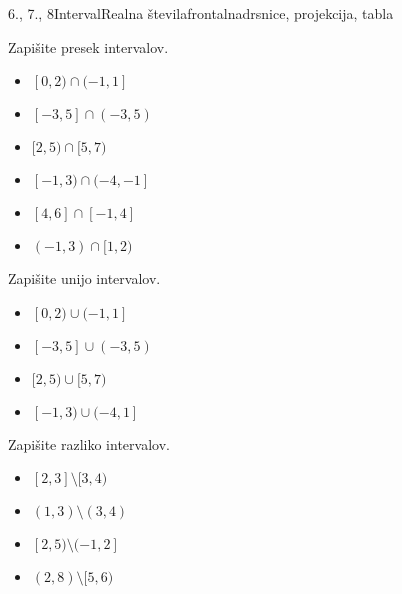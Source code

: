 \begin{priprava}{6., 7., 8}{}{Interval}{Realna števila}{frontalna}{drsnice, projekcija, tabla}
\begin{multicols}{2}
        
            \begin{naloga}
                Zapišite presek intervalov.
                \begin{itemize}
                    
                        \item $ [0,2)\cap(-1,1]$ 
                        \item $ [-3,5]\cap(-3,5)$ 
                        \item $ [2,5)\cap[5,7)$ 
                        \item $ [-1,3)\cap(-4,-1]$ 
                        \item $ [4,6]\cap[-1,4]$ 
                        \item $ (-1,3)\cap[1,2)$ 
                    

                \end{itemize}
            \end{naloga}
        


        
            \begin{naloga}
                Zapišite unijo intervalov.
                \begin{itemize}
                        \item $ [0,2)\cup(-1,1]$ 
                        \item $ [-3,5]\cup(-3,5)$ 
                        \item $ [2,5)\cup[5,7)$ 
                        \item $ [-1,3)\cup(-4,1]$ 
                \end{itemize}
            \end{naloga}
        


        
        
            \begin{naloga}
                Zapišite razliko intervalov.
                \begin{itemize}
                        \item $ [2,3]\setminus[3,4)$ 
                        \item $ (1,3)\setminus(3,4)$ 
                        \item $ [2,5)\setminus(-1,2]$ 
                        \item $ (2,8)\setminus[5,6)$ 
                \end{itemize}
            \end{naloga}
        



\end{multicols}
\end{priprava}
